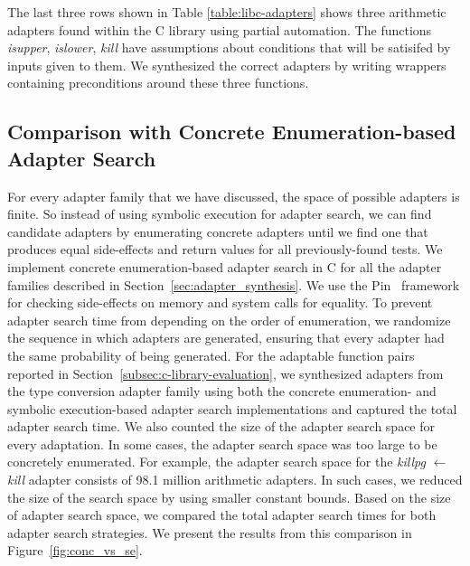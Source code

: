 The last three rows shown in Table \ref{table:libc-adapters} shows three arithmetic adapters found within the C library using partial automation.
%
The functions \textit{isupper}, \textit{islower}, \textit{kill} have assumptions about conditions that will be satisifed by inputs given to them.
% 
We synthesized the correct adapters by writing wrappers containing preconditions around these three functions. %
%
\subsection{Comparison with Concrete Enumeration-based Adapter Search}
\label{subsec:conc-search}
For every adapter family that we have discussed, the space of possible adapters is finite.
%
So instead of using symbolic execution for adapter search, we can find candidate adapters by enumerating concrete adapters until we find one that produces equal side-effects and return values for all previously-found tests.
%
We implement concrete enumeration-based adapter search in C for all the adapter families described in Section~\ref{sec:adapter_synthesis}.
%
We use the Pin~\cite{pin} framework for checking side-effects on memory and system calls for equality.
%
To prevent adapter search time from depending on the order of enumeration, we randomize the sequence in which adapters are generated, ensuring that every adapter had the same probability of being generated.
%
For the adaptable function pairs reported in Section~\ref{subsec:c-library-evaluation}, we synthesized adapters from the type conversion adapter family using both the concrete enumeration- and symbolic execution-based adapter search implementations and captured the total adapter search time.
%
We also counted the size of the adapter search space for every adaptation.
%
In some cases, the adapter search space was too large to be concretely enumerated.
%
For example, the adapter search space for the \textit{killpg} $\leftarrow$ \textit{kill} adapter consists of 98.1 million arithmetic adapters.
%
In such cases, we reduced the size of the search space by using smaller constant bounds.
%
Based on the size of adapter search space, we compared the total adapter search times for both adapter search strategies.
%
We present the results from this comparison in Figure~\ref{fig:conc_vs_se}.
%
